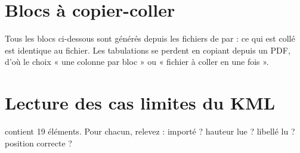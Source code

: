 \appendix
\section{Blocs à copier-coller}\label{sec:blocs}
Tous les blocs ci-dessous sont générés depuis les fichiers de  par  : ce qui est collé est identique au fichier. Les tabulations se perdent en copiant depuis un PDF, d'où le choix « une colonne par bloc » ou « fichier à coller en une fois ».


\section{Lecture des cas limites du KML}\label{sec:kmledge}
 contient 19 éléments. Pour chacun, relevez : importé ? hauteur lue ? libellé lu ? position correcte ?
